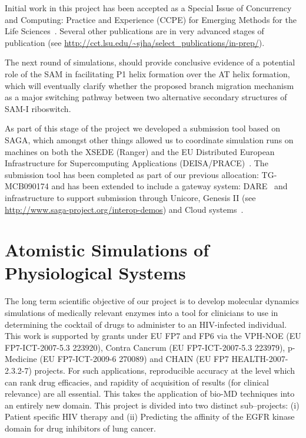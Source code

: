 \documentclass[a4paper,11pt]{article}
\begin{document}
Initial work in this project has been accepted as a Special Issue of
Concurrency and Computing: Practice and Experience (CCPE) for Emerging
Methods for the Life Sciences~\cite{ecmls_ccpe10}.  Several other
publications are in very advanced stages of publication (see
\url{http://cct.lsu.edu/~sjha/select_publications/in-prep/}).

The next round of simulations, should provide conclusive evidence of a potential role of the SAM in facilitating P1 helix formation over the AT helix formation, which will eventually clarify whether the proposed branch migration mechanism as a major switching pathway between two alternative secondary structures of SAM-I riboswitch.

As part of this stage of the project we developed a submission tool based on SAGA, which amongst other things allowed us to coordinate simulation runs on machines on both the XSEDE (Ranger) and the EU Distributed European Infrastructure for Supercomputing Applications (DEISA/PRACE)~\cite{DEISA-PRACE}. The submission tool has been completed as part of our previous allocation: TG-MCB090174 and has been extended to include a gateway system: DARE~\cite{dare-tg11} and infrastructure to support submission through Unicore, Genesis II (see \url{http://www.saga-project.org/interop-demos}) and Cloud systems~\cite{pstar11}.


\section{Atomistic Simulations of Physiological Systems}

The long term scientific objective of our project is to develop molecular dynamics simulations of medically relevant enzymes into a tool for clinicians to use in determining the cocktail of drugs to administer to an HIV-infected individual. This work is supported by grants under EU FP7 and FP6 via the VPH-NOE (EU FP7-ICT-2007-5.3 223920), Contra Cancrum (EU FP7-ICT-2007-5.3 223979), p-Medicine (EU FP7-ICT-2009-6 270089) and CHAIN (EU FP7 HEALTH-2007-2.3.2-7) projects. For such applications, reproducible accuracy at the level which can rank drug efficacies, and rapidity of acquisition of results (for clinical relevance) are all essential. This takes the application of bio-MD techniques into an entirely new domain. This project is divided into two distinct sub--projects: (i) Patient specific HIV therapy and (ii) Predicting the affinity of the EGFR kinase domain for drug inhibitors of lung cancer.
\end{document}
